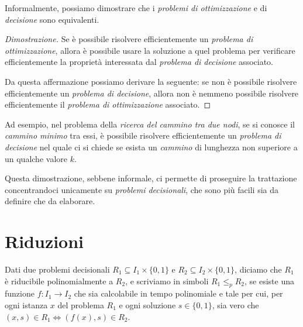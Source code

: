 \noindent
Informalmente, possiamo dimostrare che i \emph{problemi di ottimizzazione} e di
\emph{decisione} sono equivalenti.

\begin{proof}[Dimostrazione]
    Se è possibile risolvere efficientemente un \emph{problema di ottimizzazione},
    allora è possibile usare la soluzione a quel problema per verificare
    efficientemente la proprietà interessata dal \emph{problema di decisione}
    associato.

    Da questa affermazione possiamo derivare la seguente: se non è possibile
    risolvere efficientemente un \emph{problema di decisione}, allora non è
    nemmeno possibile risolvere efficientemente il \emph{problema di
    ottimizzazione} associato.
\end{proof}
\begin{note}
    Ad esempio, nel problema della \emph{ricerca del cammino tra due nodi}, se
    si conosce il \emph{cammino minimo} tra essi, è possibile risolvere
    efficientemente un \emph{problema di decisione} nel quale ci si chiede se
    esista un \emph{cammino} di lunghezza non superiore a un qualche valore $k$.
\end{note}

\noindent
Questa dimostrazione, sebbene informale, ci permette di proseguire la trattazione
concentrandoci unicamente su \emph{problemi decisionali}, che sono più facili sia
da definire che da elaborare.

\section{Riduzioni}
\begin{definition}
    Dati due problemi decisionali $R_1\subseteq I_1\times\{0,1\}$ e
    $R_2\subseteq I_2\times\{0,1\}$, diciamo che $R_1$ è riducibile
    polinomialmente a $R_2$, e scriviamo in simboli $R_1\leq_p R_2$, se esiste
    una funzione $f:I_1\to I_2$ che sia calcolabile in tempo polinomiale e tale
    per cui, per ogni istanza $x$ del problema $R_1$ e ogni soluzione $s\in\{0,1\}$,
    sia vero che $(x,s)\in R_1\Leftrightarrow(f(x), s)\in R_2$.
\end{definition}

